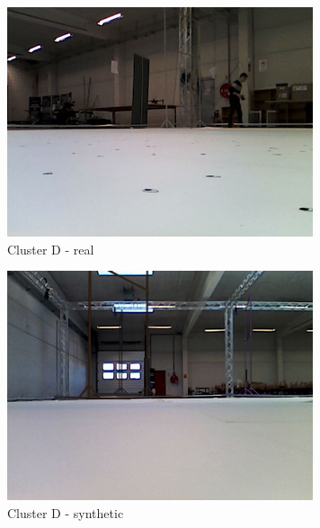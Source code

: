 \begin{figure}[h!]
   \centering
   \begin{subfigure}{0.32\textwidth}
      \includegraphics[width=\textwidth]{figure/tsne_random/D/8.png}
      \caption{Cluster D - real}
   \end{subfigure}
   \begin{subfigure}{0.32\textwidth}
      \includegraphics[width=\textwidth]{figure/tsne_random/D/9.png}
      \caption{Cluster D - synthetic}
   \end{subfigure}
   \begin{subfigure}{0.32\textwidth}

\end{subfigure}
\end{figure}
